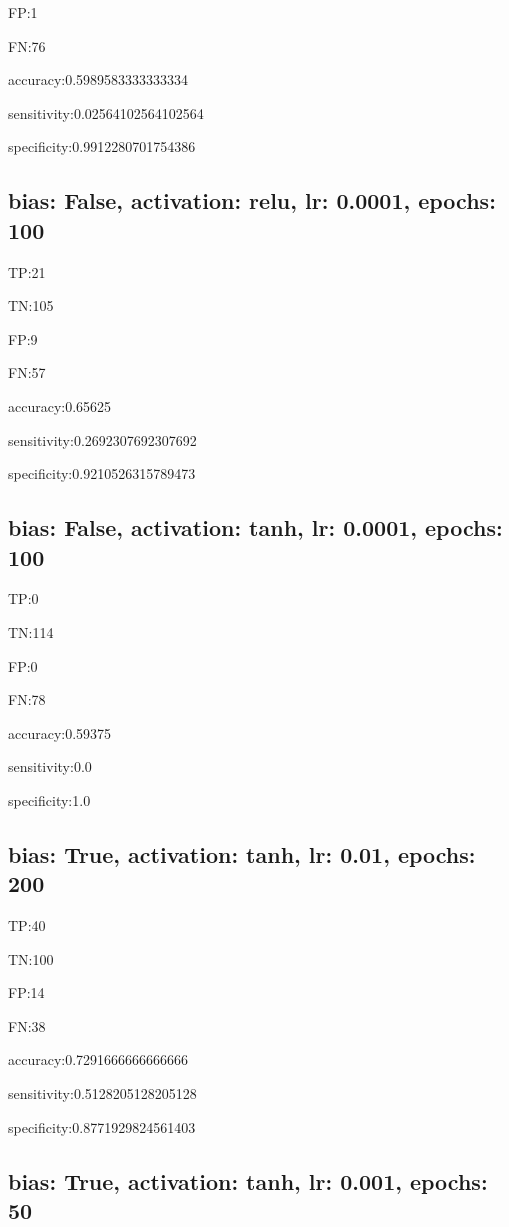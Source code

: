 \documentclass{article}
\begin{document}
FP:1

FN:76

accuracy:0.5989583333333334

sensitivity:0.02564102564102564

specificity:0.9912280701754386



\subsection{bias: False, activation: relu, lr: 0.0001, epochs: 100}

TP:21

TN:105

FP:9

FN:57

accuracy:0.65625

sensitivity:0.2692307692307692

specificity:0.9210526315789473



\subsection{bias: False, activation: tanh, lr: 0.0001, epochs: 100}

TP:0

TN:114

FP:0

FN:78

accuracy:0.59375

sensitivity:0.0

specificity:1.0



\subsection{bias: True, activation: tanh, lr: 0.01, epochs: 200}

TP:40

TN:100

FP:14

FN:38

accuracy:0.7291666666666666

sensitivity:0.5128205128205128

specificity:0.8771929824561403



\subsection{bias: True, activation: tanh, lr: 0.001, epochs: 50}
\end{document}
